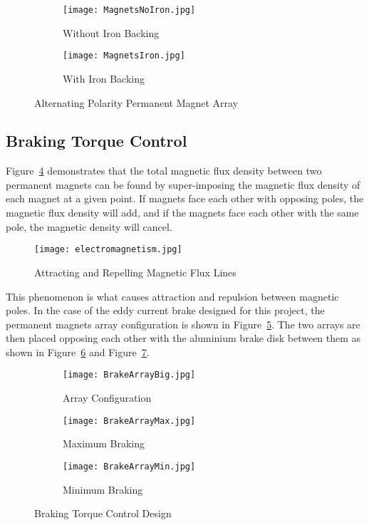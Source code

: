 \begin{figure}[H]
	\centering
	\begin{subfigure}{.5\textwidth}
		\centering
		\texttt{[image: MagnetsNoIron.jpg]}
		\caption{Without Iron Backing}
		\label{fig:magnoiron}
	\end{subfigure}%
	\begin{subfigure}{.5\textwidth}
		\centering
		\texttt{[image: MagnetsIron.jpg]}
		\caption{With Iron Backing}
		\label{fig:magiron}
	\end{subfigure}
	\caption{Alternating Polarity Permanent Magnet Array}
	\label{fig:magconf}
	\citep{Parsons:2018}
\end{figure}

\vspace*{-0.5cm}

\subsection{Braking Torque Control}

Figure~\ref{fig:Electro} demonstrates that the total magnetic flux density between two permanent magnets can be found by super-imposing the magnetic flux density of each magnet at a given point. If magnets face each other with opposing poles, the magnetic flux density will add, and if the magnets face each other with the same pole, the magnetic density will cancel.

\begin{figure}[H]
	\centering
	\texttt{[image: electromagnetism.jpg]}
	\caption{Attracting and Repelling Magnetic Flux Lines}
	\label{fig:Electro}
	\citep[2022]{electronics:2022}
\end{figure}

This phenomenon is what causes attraction and repulsion between magnetic poles. In the case of the eddy current brake designed for this project, the permanent magnets array configuration is shown in Figure~\ref{fig:MagsA}. The two arrays are then placed opposing each other with the aluminium brake disk between them as shown in Figure~\ref{fig:maxMags} and Figure~\ref{fig:minMags}.

\begin{figure}[H]
	\centering
		\begin{subfigure}{.3\textwidth}
		\centering
		\texttt{[image: BrakeArrayBig.jpg]}
		\caption{Array Configuration}
		\label{fig:MagsA}
	\end{subfigure}%
	\hfill
	\begin{subfigure}{.3\textwidth}
		\centering
		\texttt{[image: BrakeArrayMax.jpg]}
		\caption{Maximum Braking}
		\label{fig:maxMags}
	\end{subfigure}%
	\hfill
	\begin{subfigure}{.3\textwidth}
		\centering
		\texttt{[image: BrakeArrayMin.jpg]}
		\caption{Minimum Braking}
		\label{fig:minMags}
	\end{subfigure}
	\caption{Braking Torque Control Design}
	\label{fig:magarrays}
\end{figure}

